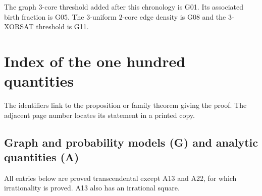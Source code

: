 \documentclass[11pt,a4paper]{article}
\theoremstyle{definition}
\theoremstyle{remark}
\begin{document}
\noindent The graph $3$-core threshold added after this chronology is G01. Its associated birth fraction is G05. The $3$-uniform $2$-core edge density is G08 and the $3$-XORSAT threshold is G11.

\clearpage\section{Index of the one hundred quantities}\label{sec:directory}
The identifiers link to the proposition or family theorem giving the proof. The adjacent page number locates its statement in a printed copy.
\subsection*{Graph and probability models (G) and analytic quantities (A)}
All entries below are proved transcendental except A13 and A22, for which irrationality is proved. A13 also has an irrational square.
\par\medskip
\end{document}
